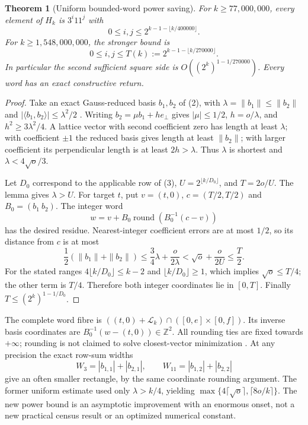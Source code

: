 \documentclass[10pt,a4paper]{article}
\newtheorem{theorem}{Theorem}
\begin{document}
\newpage
\begin{theorem}[Uniform bounded-word power saving]
For $k\ge77{,}000{,}000$, every element of $H_k$ is $3^i11^j$ with
\[
 0\le i,j\le 2^{k-1-\lfloor k/400000\rfloor}.
\]
For $k\ge1{,}548{,}000{,}000$, the stronger bound is
\[
 \boxed{0\le i,j\le T(k):=2^{k-1-\lfloor k/270000\rfloor}.} \tag{4}
\]
In particular the second sufficient square side is
$O((2^k)^{1-1/270000})$. Every word has an exact constructive return.
\end{theorem}
\begin{proof}
Take an exact Gauss-reduced basis $b_1,b_2$ of (2), with
$\lambda=\|b_1\|\le\|b_2\|$ and
$|\langle b_1,b_2\rangle|\le\lambda^2/2$ \cite[\S17.1]{Galbraith}.
Writing $b_2=\mu b_1+h e_\perp$ gives $|\mu|\le1/2$,
$h=o/\lambda$, and $h^2\ge3\lambda^2/4$.
A lattice vector with second coefficient zero has length at least $\lambda$;
with coefficient $\pm1$ the reduced basis gives length at least $\|b_2\|$;
with larger coefficient its perpendicular length is at least $2h>\lambda$.
Thus $\lambda$ is shortest and $\lambda<4\sqrt o/3$.

Let $D_0$ correspond to the applicable row of (3), $U=2^{\lfloor k/D_0\rfloor}$,
and $T=2o/U$. The lemma gives $\lambda>U$. For target $t$, put $v=(t,0)$,
$c=(T/2,T/2)$ and $B_0=(b_1\ b_2)$. The integer word
\[
 \boxed{w=v+B_0\operatorname{round}(B_0^{-1}(c-v))}          \tag{5}
\]
has the desired residue. Nearest-integer coefficient errors are at most $1/2$,
so its distance from $c$ is at most
\[
 \frac12(\|b_1\|+\|b_2\|)
 \le\frac34\lambda+\frac{o}{2\lambda}
 <\sqrt o+\frac{o}{2U}\le\frac T2.
\]
For the stated ranges $4\lfloor k/D_0\rfloor\le k-2$ and
$\lfloor k/D_0\rfloor\ge1$, which implies $\sqrt o\le T/4$; the other
term is $T/4$. Therefore both integer coordinates lie in $[0,T]$.
Finally $T\le(2^k)^{1-1/D_0}$.
\end{proof}

The complete word fibre is $((t,0)+\mathcal L_k)\cap([0,e]\times[0,f])$.
Its inverse basis coordinates are $B_0^{-1}(w-(t,0))\in\mathbb Z^2$.
All rounding ties are fixed towards $+\infty$; rounding is not claimed to solve
closest-vector minimization \cite[\S18.2]{Galbraith}.
At any precision the exact row-sum widths
\[
 W_3=|b_{1,1}|+|b_{2,1}|,\qquad W_{11}=|b_{1,2}|+|b_{2,2}|
\]
give an often smaller rectangle, by the same coordinate rounding argument.
The former uniform estimate used only $\lambda>k/4$, yielding
$\max\{4\lceil\sqrt o\rceil,\lceil8o/k\rceil\}$.
The new power bound is an asymptotic improvement with an enormous onset,
not a new practical census result or an optimized numerical constant.
\end{document}
